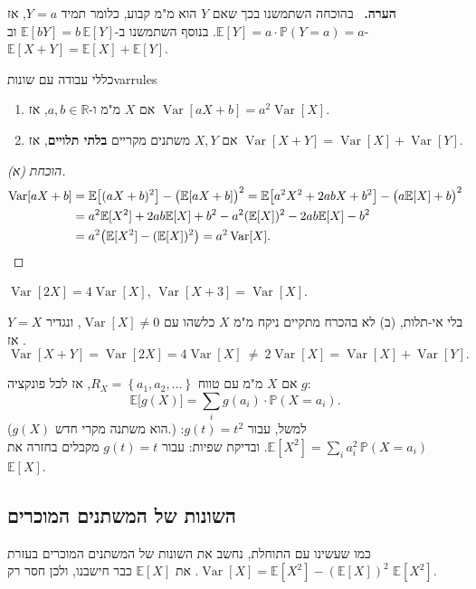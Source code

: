 \documentclass[11pt,a4paper]{report}
\newenvironment{remark}{\par\smallskip\noindent\textsf{\textbf{הערה.}}\ }{\par\smallskip}
\newcommand{\R}{\mathbb{R}}
\newcommand{\set}[1]{\left\{#1\right\}}
\newcommand{\PP}{\mathbb{P}}
\newcommand{\E}{\mathbb{E}}
\DeclareMathOperator{\Var}{Var}
\begin{document}
\begin{remark}
בהוכחה השתמשנו בכך שאם $Y$ הוא מ"מ קבוע, כלומר תמיד $Y=a$, אז $\E[Y]=a\cdot\PP(Y=a)=a$. בנוסף השתמשנו ב-$\E[bY]=b\,\E[Y]$ וב-$\E[X+Y]=\E[X]+\E[Y]$.
\end{remark}

\begin{theorem}{כללי עבודה עם שונות}{varrules}
\begin{enumerate}[label=(\alph*)]
  \item אם $X$ מ"מ ו-$a,b\in\R$, אז $\Var[aX+b]=a^2\Var[X]$.
  \item אם $X,Y$ משתנים מקריים \textbf{בלתי תלויים}, אז $\Var[X+Y]=\Var[X]+\Var[Y]$.
\end{enumerate}
\end{theorem}
\begin{proof}[הוכחת (א)]
\begin{align*}
  \Var[aX+b]&=\E\big[(aX+b)^2\big]-\big(\E[aX+b]\big)^2=\E\big[a^2X^2+2abX+b^2\big]-\big(a\E[X]+b\big)^2\\
  &=a^2\E[X^2]+2ab\E[X]+b^2-a^2(\E[X])^2-2ab\E[X]-b^2\\
  &=a^2\big(\E[X^2]-(\E[X])^2\big)=a^2\Var[X].\qedhere
\end{align*}
\end{proof}

\begin{example}{}{}
$\Var[2X]=4\Var[X]$, \quad $\Var[X+3]=\Var[X]$.
\end{example}

\begin{example}{בלי אי-תלות, (ב) לא בהכרח מתקיים}{}
ניקח מ"מ $X$ כלשהו עם $\Var[X]\neq0$, ונגדיר $Y=X$. אז
\[
  \Var[X+Y]=\Var[2X]=4\Var[X]\ \neq\ 2\Var[X]=\Var[X]+\Var[Y].
\]
\end{example}

\begin{keybox}[title={תוחלת של פונקציה של משתנה מקרי}]
אם $X$ מ"מ עם טווח $R_X=\set{a_1,a_2,\dots}$, אז לכל פונקציה $g$:
\[
  \E\big[g(X)\big]=\sum_i g(a_i)\cdot\PP(X=a_i).
\]
($g(X)$ הוא משתנה מקרי חדש.) למשל, עבור $g(t)=t^2$: $\E[X^2]=\sum_i a_i^2\,\PP(X=a_i)$. ובדיקת שפיות: עבור $g(t)=t$ מקבלים בחזרה את $\E[X]$.
\end{keybox}

\subsection{השונות של המשתנים המוכרים}

כמו שעשינו עם התוחלת, נחשב את השונות של המשתנים המוכרים בעזרת $\Var[X]=\E[X^2]-(\E[X])^2$. את $\E[X]$ כבר חישבנו, ולכן חסר רק $\E[X^2]$.
\end{document}
